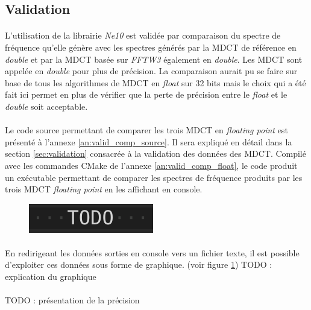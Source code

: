 \documentclass{article}
\begin{document}
    \subsection{Validation}
    \paragraph{}
    L'utilisation de la librairie \emph{Ne10} est validée par comparaison du spectre de fréquence qu'elle génère avec les spectres générés par la MDCT de référence en \emph{double} et par la MDCT basée sur \emph{FFTW3} également en \emph{double}. Les MDCT sont appelée en \emph{double} pour plus de précision. La comparaison aurait pu se faire sur base de tous les algorithmes de MDCT en \emph{float} sur 32 bits mais le choix qui a été fait ici permet en plus de vérifier que la perte de précision entre le \emph{float} et le \emph{double} soit acceptable.

    \paragraph{}
    Le code source permettant de comparer les trois MDCT en \emph{floating point} est présenté à l'annexe \ref{an:valid_comp_source}. Il sera expliqué en détail dans la section \ref{sec:validation} consacrée à la validation des données des MDCT. Compilé avec les commandes CMake de l'annexe \ref{an:valid_comp_float}, le code produit un exécutable permettant de comparer les spectres de fréquence produits par les trois MDCT \emph{floating point} en les affichant en console.

    \begin{figure}[H]
        \centering
        \includegraphics[width=.1\linewidth]{./images/TODO.png}
        \caption{}
        \label{fig:comp_mdct_float}
    \end{figure}

    \paragraph{}
    En redirigeant les données sorties en console vers un fichier texte, il est possible d'exploiter ces données sous forme de graphique. (voir figure \ref{fig:comp_mdct_float}) TODO : explication du graphique

    \paragraph{}
    TODO : présentation de la précision
\end{document}
